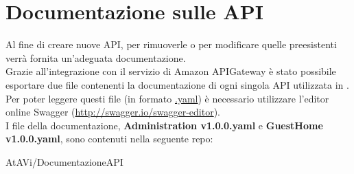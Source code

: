 \documentclass[../ManualeSviluppatore_v2.0.0.tex]{subfiles}
\begin{document}
\section{Documentazione sulle API}

	Al fine di creare nuove API, per rimuoverle o per modificare quelle preesistenti verrà fornita un'adeguata documentazione.\\
	Grazie all'integrazione con il servizio di Amazon APIGateway è stato possibile esportare due file contenenti la documentazione di ogni singola API utilizzata in \atavi. Per poter leggere questi file (in formato \underline{.yaml}) è necessario utilizzare l'editor online Swagger (\url{http://swagger.io/swagger-editor}).\\
	I file della documentazione, \textbf{Administration v1.0.0.yaml} e \textbf{GuestHome v1.0.0.yaml}, sono contenuti nella seguente repo:
	\begin{center}
		AtAVi/DocumentazioneAPI
	\end{center}
	
\end{document}
